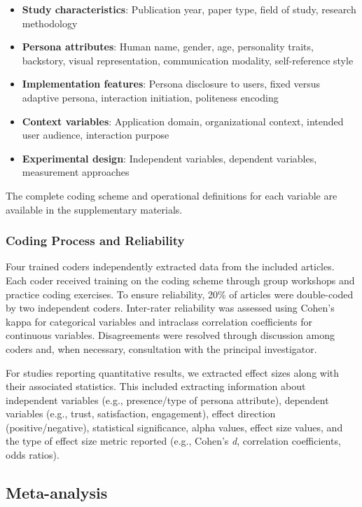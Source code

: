 \documentclass{article}
\begin{document}
\begin{itemize}
    \item \textbf{Study characteristics}: Publication year, paper type, field of study, research methodology
    \item \textbf{Persona attributes}: Human name, gender, age, personality traits, backstory, visual representation, communication modality, self-reference style
    \item \textbf{Implementation features}: Persona disclosure to users, fixed versus adaptive persona, interaction initiation, politeness encoding
    \item \textbf{Context variables}: Application domain, organizational context, intended user audience, interaction purpose
    \item \textbf{Experimental design}: Independent variables, dependent variables, measurement approaches
\end{itemize}

The complete coding scheme and operational definitions for each variable are available in the supplementary materials.

\subsubsection{Coding Process and Reliability}

Four trained coders independently extracted data from the included articles. Each coder received training on the coding scheme through group workshops and practice coding exercises. To ensure reliability, 20\% of articles were double-coded by two independent coders. Inter-rater reliability was assessed using Cohen's kappa for categorical variables and intraclass correlation coefficients for continuous variables. Disagreements were resolved through discussion among coders and, when necessary, consultation with the principal investigator. 

For studies reporting quantitative results, we extracted effect sizes along with their associated statistics. This included extracting information about independent variables (e.g., presence/type of persona attribute), dependent variables (e.g., trust, satisfaction, engagement), effect direction (positive/negative), statistical significance, alpha values, effect size values, and the type of effect size metric reported (e.g., Cohen's \textit{d}, correlation coefficients, odds ratios).

\subsection{Meta-analysis}
\end{document}
